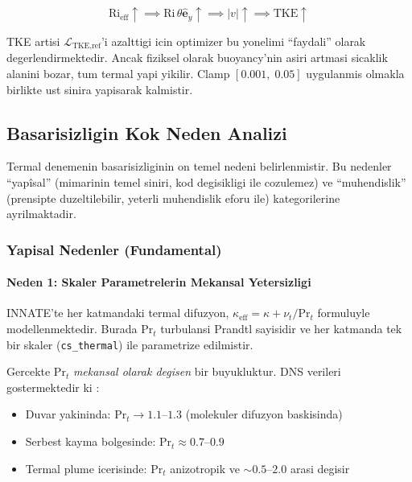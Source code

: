 \begin{equation}
  \text{Ri}_\text{eff} \uparrow \implies
  \text{Ri}\,\theta\hat{\mathbf{e}}_y \uparrow \implies
  |v| \uparrow \implies
  \text{TKE} \uparrow
  \label{eq:buoyancy-feedback}
\end{equation}

TKE artisi $\mathcal{L}_\text{TKE,ref}$'i azalttigi icin optimizer bu
yonelimi ``faydali'' olarak degerlendirmektedir. Ancak fiziksel olarak
buoyancy'nin asiri artmasi sicaklik alanini bozar, tum termal yapi yikilir.
Clamp $[\text{0.001},\;\text{0.05}]$ uygulanmis olmakla birlikte ust sinira
yapisarak kalmistir.


\subsection{Basarisizligin Kok Neden Analizi}
\label{sec:root-cause}

Termal denemenin basarisizliginin on temel nedeni belirlenmistir. Bu
nedenler ``yapîsal'' (mimarinin temel siniri, kod degisikligi ile
cozulemez) ve ``muhendislik'' (prensipte duzeltilebilir, yeterli
muhendislik eforu ile) kategorilerine ayrilmaktadir.


\subsubsection{Yapisal Nedenler (Fundamental)}
\label{sec:fundamental-causes}

\paragraph{Neden 1: Skaler Parametrelerin Mekansal Yetersizligi}

INNATE'te her katmandaki termal difuzyon, $\kappa_\text{eff} =
\kappa + \nu_t/\text{Pr}_t$ formuluyle modellenmektedir. Burada
$\text{Pr}_t$ turbulansi Prandtl sayisidir ve her katmanda tek bir skaler
(\texttt{cs\_thermal}) ile parametrize edilmistir.

Gercekte $\text{Pr}_t$ \emph{mekansal olarak degisen} bir buyukluktur.
DNS verileri gostermektedir ki \cite{kays1994turbulent}:

\begin{itemize}
  \item Duvar yakininda: $\text{Pr}_t \to 1.1$--$1.3$
        (molekuler difuzyon baskisinda)
  \item Serbest kayma bolgesinde: $\text{Pr}_t \approx 0.7$--$0.9$
  \item Termal plume icerisinde: $\text{Pr}_t$ anizotropik ve $\sim 0.5$--$2.0$
        arasi degisir
\end{itemize}

